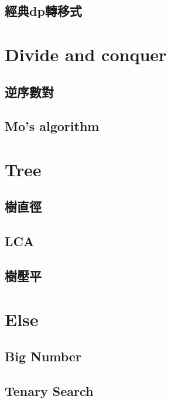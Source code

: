 \subsection{經典dp轉移式}


\section{Divide and conquer}
\subsection{逆序數對}

\subsection{Mo's algorithm}


\section{Tree}
\subsection{樹直徑}

\subsection{LCA}

\subsection{樹壓平}


\section{Else}
\subsection{Big Number}

\subsection{Tenary Search}
